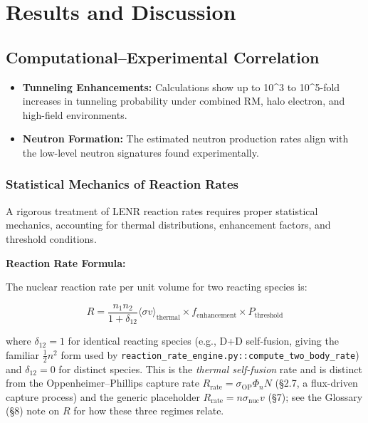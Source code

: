 \documentclass[11pt,a4paper]{article}
\begin{document}
\section{Results and Discussion}

\subsection{Computational--Experimental Correlation}

\begin{itemize}
\item
  \textbf{Tunneling Enhancements:} Calculations show up to 10\^{}3 to 10\^{}5-fold increases in tunneling probability under combined RM, halo electron, and high-field environments.
\item
  \textbf{Neutron Formation:} The estimated neutron production rates align with the low-level neutron signatures found experimentally.
\end{itemize}

\subsubsection{Statistical Mechanics of Reaction Rates}

A rigorous treatment of LENR reaction rates requires proper statistical mechanics, accounting for thermal distributions, enhancement factors, and threshold conditions.

\textbf{Reaction Rate Formula:}

The nuclear reaction rate per unit volume for two reacting species is:

\begin{equation}
R = \frac{n_1 n_2}{1+\delta_{12}} \langle \sigma v \rangle_{\text{thermal}} \times f_{\text{enhancement}} \times P_{\text{threshold}}
\end{equation}

where $\delta_{12} = 1$ for identical reacting species (e.g., D+D self-fusion, giving the familiar $\tfrac{1}{2}n^2$ form used by \texttt{reaction\_rate\_engine.py::compute\_two\_body\_rate}) and $\delta_{12} = 0$ for distinct species. This is the \emph{thermal self-fusion} rate and is distinct from the Oppenheimer--Phillips capture rate $R_{\text{rate}} = \sigma_{\text{OP}}\Phi_n N$ (\S{}2.7, a flux-driven capture process) and the generic placeholder $R_{\text{rate}} = n\sigma_{\text{nuc}}v$ (\S{}7); see the Glossary (\S{}8) note on $R$ for how these three regimes relate.
\end{document}
